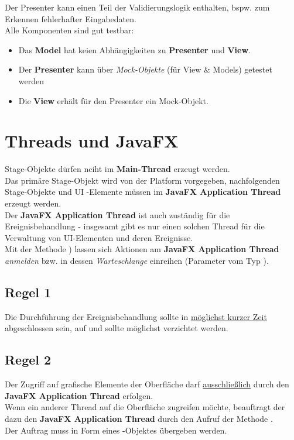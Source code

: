 \noindent
Der Presenter kann einen Teil der Validierungslogik enthalten, bspw. zum Erkennen fehlerhafter Eingabedaten.\\

\noindent
Alle Komponenten sind gut testbar:

\begin{itemize}
    \item Das \textbf{Model} hat keien Abhängigkeiten zu \textbf{Presenter} und \textbf{View}.
    \item Der \textbf{Presenter} kann über \textit{Mock-Objekte} (für View & Models) getestet werden
    \item Die \textbf{View} erhält für den Presenter ein Mock-Objekt.
\end{itemize}

\section{Threads und JavaFX}

Stage-Objekte dürfen nciht im \textbf{Main-Thread} erzeugt werden. \\
Das primäre Stage-Objekt wird von der Platform vorgegeben, nachfolgenden Stage-Objekte und UI -Elemente müssen im \textbf{JavaFX Application Thread} erzeugt werden.\\

\noindent
Der \textbf{JavaFX Application Thread} ist auch zuständig für die Ereignisbehandlung - insgesamt gibt es nur einen solchen Thread für die Verwaltung von UI-Elementen und deren Ereignisse. \\

\noindent
Mit der Methode ) lassen sich Aktionen am \textbf{JavaFX Application Thread} \textit{anmelden} bzw. in dessen \textit{Warteschlange} einreihen (Parameter vom Typ ).\\

\subsection*{Regel 1}
Die Durchführung der Ereignisbehandlung sollte in \ul{möglichst kurzer Zeit} abgeschlossen sein, auf  und  sollte möglichst verzichtet werden.

\subsection*{Regel 2}
Der Zugriff auf grafische Elemente der Oberfläche darf \ul{ausschließlich} durch den \textbf{JavaFX Application Thread} erfolgen.\\
Wenn ein anderer Thread auf die Oberfläche zugreifen möchte, beauftragt der dazu den \textbf{JavaFX Application Thread} durch den Aufruf der Methode .\\
Der Auftrag muss in Form eines -Objektes übergeben werden.\\


